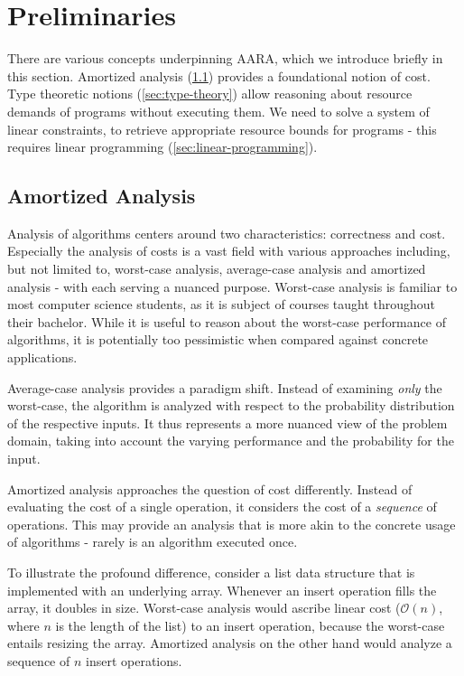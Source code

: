 \chapter{Preliminaries} \label{chap:preliminaries}

There are various concepts underpinning AARA, which we introduce briefly in this section. Amortized analysis (\cref{sec:amortized-analysis}) provides a foundational notion of cost. Type theoretic notions (\cref{sec:type-theory}) allow reasoning about resource demands of programs without executing them. We need to solve a system of linear constraints, to retrieve appropriate resource bounds for programs - this requires linear programming (\cref{sec:linear-programming}). 

\section{Amortized Analysis}\label{sec:amortized-analysis}

Analysis of algorithms centers around two characteristics: correctness and cost. Especially the analysis of costs is a vast field with various approaches including, but not limited to, worst-case analysis, average-case analysis and amortized analysis - with each serving a nuanced purpose. Worst-case analysis is familiar to most computer science students, as it is subject of courses taught throughout their bachelor. While it is useful to reason about the worst-case performance of algorithms, it is potentially too pessimistic when compared against concrete applications. 

Average-case analysis provides a paradigm shift. Instead of examining \emph{only} the worst-case, the algorithm is analyzed with respect to the probability distribution of the respective inputs. It thus represents a more nuanced view of the problem domain, taking into account the varying performance and the probability for the input. 

Amortized analysis approaches the question of cost differently. Instead of evaluating the cost of a single operation, it considers the cost of a \emph{sequence} of operations. This may provide an analysis that is more akin to the concrete usage of algorithms - rarely is an algorithm executed once.

To illustrate the profound difference, consider a list data structure that is implemented with an underlying array. Whenever an insert operation fills the array, it doubles in size. Worst-case analysis would ascribe linear cost (\(\mathcal{O}(n)\), where \(n\) is the length of the list) to an insert operation, because the worst-case entails resizing the array. Amortized analysis on the other hand would analyze a sequence of \(n\) insert operations.

